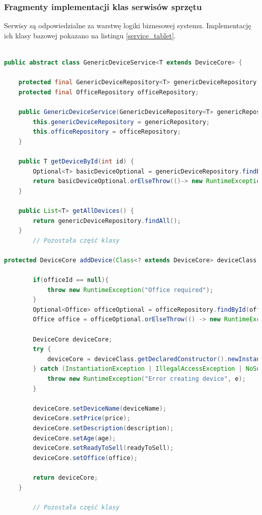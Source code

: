 \subsubsection{Fragmenty implementacji klas serwisów sprzętu}
Serwisy są odpowiedzialne za warstwę logiki biznesowej systemu. Implementację ich klasy bazowej pokazano na listingu \ref{service_tablet}.
\begin{lstlisting}[language=Java, style=JavaStyle,  caption={Klasa nadrzędna serwisu sprzętu GenericDeviceService}, label={service_tablet}]

public abstract class GenericDeviceService<T extends DeviceCore> {

    protected final GenericDeviceRepository<T> genericDeviceRepository;
    protected final OfficeRepository officeRepository;

    public GenericDeviceService(GenericDeviceRepository<T> genericRepository, OfficeRepository officeRepository) {
        this.genericDeviceRepository = genericRepository;
        this.officeRepository = officeRepository;
    }

    public T getDeviceById(int id) {
        Optional<T> basicDeviceOptional = genericDeviceRepository.findById(id);
        return basicDeviceOptional.orElseThrow(()-> new RuntimeException("Device not found with id: " + id));
    }

    public List<T> getAllDevices() {
        return genericDeviceRepository.findAll();
    }
		// Pozostała część klasy

protected DeviceCore addDevice(Class<? extends DeviceCore> deviceClass, String deviceName, Double price, String description, Integer age, Boolean readyToSell, Integer officeId) {

        if(officeId == null){
            throw new RuntimeException("Office required");
        }
        Optional<Office> officeOptional = officeRepository.findById(officeId);
        Office office = officeOptional.orElseThrow(() -> new RuntimeException("Office not found with id: " + officeId));

        DeviceCore deviceCore;
        try {
            deviceCore = deviceClass.getDeclaredConstructor().newInstance();
        } catch (InstantiationException | IllegalAccessException | NoSuchMethodException | InvocationTargetException e) {
            throw new RuntimeException("Error creating device", e);
        }

        deviceCore.setDeviceName(deviceName);
        deviceCore.setPrice(price);
        deviceCore.setDescription(description);
        deviceCore.setAge(age);
        deviceCore.setReadyToSell(readyToSell);
        deviceCore.setOffice(office);

        return deviceCore;
    }
		
		// Pozostała część klasy
\end{lstlisting}
